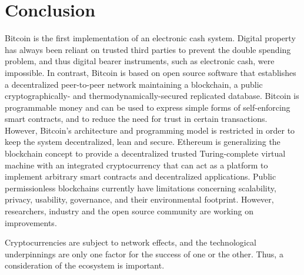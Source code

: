 \section{Conclusion}

Bitcoin is the first implementation of an electronic cash system. Digital property has always been reliant on trusted third parties to prevent the double spending problem, and thus digital bearer instruments, such as electronic cash, were impossible. In contrast, Bitcoin is based on open source software that establishes a decentralized peer-to-peer network maintaining a blockchain, a public cryptographically- and thermodynamically-secured replicated database. Bitcoin is programmable money and can be used to express simple forms of self-enforcing smart contracts, and to reduce the need for trust in certain transactions. However, Bitcoin's architecture and programming model is restricted in order to keep the system decentralized, lean and secure. Ethereum is generalizing the blockchain concept to provide a decentralized trusted Turing-complete virtual machine with an integrated cryptocurrency that can act as a platform to implement arbitrary smart contracts and decentralized applications. Public permissionless blockchains currently have limitations concerning scalability, privacy, usability, governance, and their environmental footprint. However, researchers, industry and the open source community are working on improvements. 

Cryptocurrencies are subject to network effects, and the technological underpinnings are only one factor for the success of one or the other. Thus, a consideration of the ecosystem is important.
